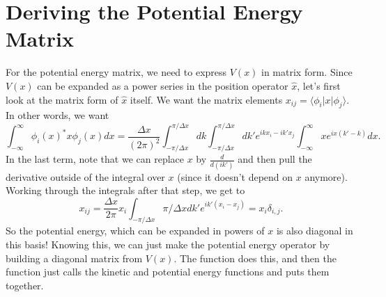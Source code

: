 \documentclass[letterpaper,10pt,english]{jupyterBook}
\begin{document}
\section{Deriving the Potential Energy Matrix}
\label{\detokenize{Section4_v2:deriving-the-potential-energy-matrix}}
\sphinxAtStartPar
For the potential energy matrix, we need to express \(V(x)\) in matrix form. Since \(V(x)\) can be expanded as a power series in the position operator \(\hat{x}\), let’s first look at the matrix form of \(\hat{x}\) itself. We want the matrix elements \(x_{ij} = \langle \phi_i | x | \phi_j \rangle\). In other words, we want
\label{equation:Section4_v2:458d7eca-ae02-41a4-8133-94af0605d3fa}\begin{equation}
\int_{-\infty}^{\infty} \phi_i(x)^\ast x \phi_j(x) dx = \frac{\Delta x}{(2\pi)^2} \int_{-\pi/\Delta x}^{\pi/\Delta x} dk \int_{-\pi/\Delta x}^{\pi/\Delta x} dk' e^{ikx_i - ik'x_j} \int_{-\infty}^{\infty} x e^{i x (k'-k)} dx.
\end{equation}
\sphinxAtStartPar
In the last term, note that we can replace \(x\) by \(\frac{d}{d(ik')}\) and then pull the derivative outside of the integral over \(x\) (since it doesn’t depend on \(x\) anymore).  Working through the integrals after that step, we get to
\label{equation:Section4_v2:21828791-ac00-4992-967e-d21039c15cfe}\begin{equation}
x_{ij} = \frac{\Delta x}{2\pi} x_i \int_{-\pi/\Delta x}{\pi/\Delta x} dk' e^{ik'(x_i-x_j)} = x_i \delta_{i,j}.
\end{equation}
\sphinxAtStartPar
{} So the potential energy, which can be expanded in powers of \(x\) is also diagonal in this basis! Knowing this, we can just make the potential energy operator by building a diagonal matrix from \(V(x)\). The function  does this, and then the function  just calls the kinetic and potential energy functions and puts them together.
\end{document}
